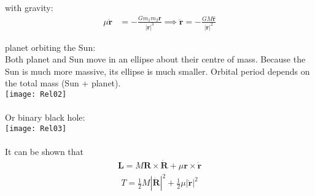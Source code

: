\documentclass[a4paper]{article}
\begin{document}
\begin{eg} with gravity:
\begin{equation*}
\begin{aligned}
\mu \ddot{\mathbf{r}} &= -\frac{G m_{1} m_{2} \mathbf{r}}{|\mathbf{r}|^3} \implies \ddot{\mathbf{r}} = -\frac{GM\mathbf{\hat{r}}}{|\mathbf{r}|^2}
\end{aligned}
\end{equation*}
\end{eg}

\begin{eg} planet orbiting the Sun:\\
Both planet and Sun move in an ellipse about their centre of mass. Because the Sun is much more massive, its ellipse is much smaller. Orbital period depends on the total mass (Sun + planet).\\
\texttt{[image: Rel02]}\\\\
Or binary black hole:\\
\texttt{[image: Rel03]}\\\\
It can be shown that
\begin{equation*}
\begin{aligned}
\mathbf{L} = M\mathbf{R}\times \dot{\mathbf{R}} + \mu \mathbf{r} \times \dot{\mathbf{r}}
\end{aligned}
\end{equation*}
\begin{equation*}
\begin{aligned}
T = \frac{1}{2} M |\dot{\mathbf{R}}|^2 + \frac{1}{2} \mu |\dot{\mathbf{r}}|^2
\end{aligned}
\end{equation*}
\end{eg}
\end{document}
